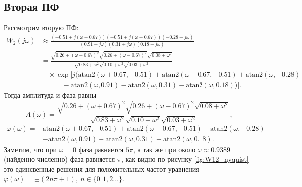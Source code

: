\newpage
\subsection{Вторая ПФ}

Рассмотрим вторую ПФ:
\begin{equation*}
    \begin{split}
        W_2(j\omega) & \approx
        \frac{(-0.51 + j(\omega + 0.67))(-0.51 + j(\omega - 0.67))(-0.28 + j\omega)}
             {(0.91 + j\omega)(0.31 + j\omega)(0.18 + j\omega)} \\
        & = 
        \frac{
            \sqrt{0.26 + (\omega + 0.67)^2} \sqrt{0.26 + (\omega - 0.67)^2} \sqrt{0.08 + \omega^2}
        }{
            \sqrt{0.83 + \omega^2} \sqrt{0.10 + \omega^2} \sqrt{0.03 + \omega^2}
        } \\
        & \quad \times 
        \exp\Big[j(
            \text{atan2}(\omega + 0.67, -0.51) 
            + \text{atan2}(\omega - 0.67, -0.51) 
            + \text{atan2}(\omega, -0.28) \\
        & \quad \quad \quad
            - \text{atan2}(\omega, 0.91) 
            - \text{atan2}(\omega, 0.31) 
            - \text{atan2}(\omega, 0.18))
        \Big].
    \end{split}
\end{equation*}
Тогда амплитуда и фаза равны
\begin{equation*}
    A(\omega)=\frac{
            \sqrt{0.26 + (\omega + 0.67)^2} \sqrt{0.26 + (\omega - 0.67)^2} \sqrt{0.08 + \omega^2}
        }{
            \sqrt{0.83 + \omega^2} \sqrt{0.10 + \omega^2} \sqrt{0.03 + \omega^2}
        },
\end{equation*}
\begin{equation*}
\begin{split}
    \varphi(\omega)=&\text{atan2}(\omega + 0.67, -0.51) 
    + \text{atan2}(\omega - 0.67, -0.51) 
    + \text{atan2}(\omega, -0.28)\\
    &- \text{atan2}(\omega, 0.91) 
    - \text{atan2}(\omega, 0.31) 
    - \text{atan2}(\omega, 0.18).
\end{split}
\end{equation*}
Заметим, что при $\omega=0$ фаза равняется $5\pi$, а так же при около $\omega\approx 0.9389$
(найденно численно)  фаза равняется $\pi$, как видно по рисунку \ref{fig:W12_nyquist}
 - это единсвенные решения для положительных частот уравнения $\varphi(\omega)=\pm(2n\pi+1),\ n\in\{0, 1, 2\dots\}$.

